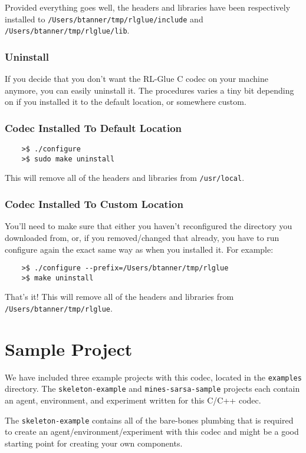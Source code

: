 \documentclass[11pt]{article}
\begin{document}
Provided everything goes well, the headers and libraries have been respectively installed to\newline
\texttt{/Users/btanner/tmp/rlglue/include} and \texttt{/Users/btanner/tmp/rlglue/lib}.


\subsubsection{Uninstall}
If you decide that you don't want the RL-Glue C codec on your machine anymore, you can easily uninstall it.  The procedures varies a tiny bit depending on if you installed it to the default location, or somewhere custom.

\subsubsection{Codec Installed To Default Location}
\begin{verbatim}
	>$ ./configure
	>$ sudo make uninstall
\end{verbatim}

This will remove all of the headers and libraries from \texttt{/usr/local}.

\subsubsection{Codec Installed To Custom Location}
You'll need to make sure that either you haven't reconfigured the directory you downloaded from, or, if you removed/changed that already, you have to run configure again the exact same way as when you installed it.  For example:
\begin{verbatim}
	>$ ./configure --prefix=/Users/btanner/tmp/rlglue
	>$ make uninstall
\end{verbatim}

That's it!  This will remove all of the headers and libraries from \texttt{/Users/btanner/tmp/rlglue}.


\section{Sample Project}
We have included three example projects with this codec, located in the \texttt{examples} directory.  The  \texttt{skeleton-example} and \texttt{mines-sarsa-sample} projects each contain an agent, environment, and experiment written for this C/C++ codec.  

The \texttt{skeleton-example} contains all of the bare-bones plumbing that is required to create an agent/environment/experiment with this codec and might be a good starting point for creating your own components.
\end{document}
